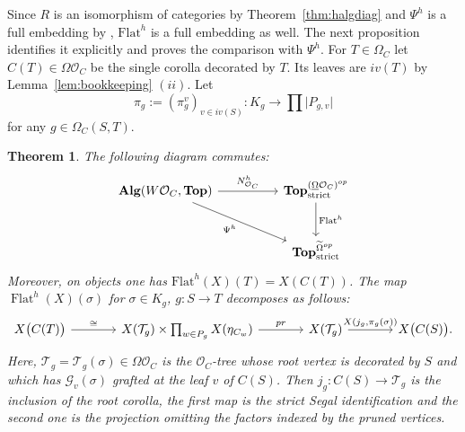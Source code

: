 \documentclass{amsart}
\newtheorem{theorem}[formula]{Theorem}
\theoremstyle{definition}
\theoremstyle{remark}
\DeclareMathOperator{\Top}{\mathbf{Top}}
\DeclareMathOperator{\Alg}{\mathbf{Alg}}
\DeclareMathOperator{\Flat}{Flat}
\begin{document}
	Since $R$ is
	an isomorphism of categories by
	Theorem~\ref{thm:halgdiag} and $\Psi^{h}$ is a full embedding by
	\cite[Thm.~B.6]{clrrw-22}, $\mathrm{Flat}^h$ is a full embedding as well. 
	The next proposition identifies it explicitly and proves the comparison with
	$\Psi^{h}$.
	For $T\in\Omega_{C}$ let $C(T)\in\Omega\mathcal{O}_{C}$ be the single corolla decorated by $T$.
	Its leaves are $iv(T)$ by Lemma~\ref{lem:bookkeeping} $(ii)$.
	Let 
	\[
	\pi_g:=
	(\pi^v_g)_{v\in iv(S)}\colon K_{g}\to \prod \lvert P_{g,v}\rvert
	\] 
	for any $g\in \Omega_C (S,T)$.
	
	\begin{theorem}\label{thm:comparison}
		The following diagram commutes:
			\[
		\begin{tikzcd}[column sep=huge, row sep=large]
			\Alg(W\mathcal{O}_C,\Top)\arrow{r}{N^h_{\mathcal{O}_C}}\arrow[swap]{dr}{\Psi^{h}}
			& \Top^{(\underline\Omega \mathcal{O}_C)^{op}}_{\mathrm{strict}}\arrow{d}{\Flat^h}\\
			& \Top^{\widetilde\Omega^{op}}_{\mathrm{strict}}
		\end{tikzcd}
		\]
		Moreover, on objects one has $\mathrm{Flat}^h(X)(T)=X(C(T))$.
		The map $\Flat^h(X)(\sigma)$ for $\sigma\in K_g$, $g\colon S\to T$ decomposes as follows:
		\begin{equation}\label{eq:flath}
			\begin{tikzcd}[row sep=large, column sep=large]
			X\bigl(C(T)\bigr) \arrow{r}{\cong} &
			X(\mathcal{T}_g)\times\prod_{w\in P_g}X(\eta_{C_w})\arrow{r}{pr} &
			X(\mathcal{T}_g)\arrow{r}{X(j_g,\pi_g(\sigma))} &
			X\bigl(C(S)\bigr).
			\end{tikzcd}
		\end{equation}
		Here, $\mathcal{T}_g=\mathcal{T}_g(\sigma)\in\Omega\mathcal{O}_C$ is the $\mathcal{O}_C$-tree whose root vertex is decorated
		by $S$ and which has $\mathcal{G}_v(\sigma)$ grafted at the leaf $v$ of $C(S)$.
		Then $j_g\colon C(S)\to \mathcal{T}_g$ is the inclusion of the root corolla, the first map
		is the strict Segal identification and the second one is the projection
		omitting the factors indexed by the pruned vertices.
	\end{theorem}
\end{document}
